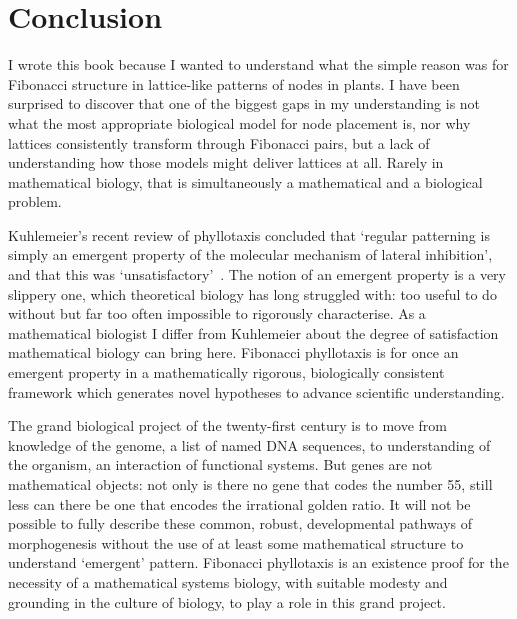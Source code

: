 \section{Conclusion}
I wrote this book because I wanted to understand what the simple reason was for Fibonacci structure in lattice-like patterns of nodes in plants. I have been surprised to discover that one of the biggest gaps in my understanding is not  what the most appropriate biological model for node placement is, nor why lattices consistently transform through Fibonacci pairs,  but a lack of understanding how those models might deliver lattices at all. Rarely in mathematical biology, that is simultaneously a mathematical and a biological problem. 

Kuhlemeier's recent review of phyllotaxis concluded  that `regular patterning is simply an emergent property of the molecular mechanism of lateral inhibition', and that this was  `unsatisfactory'~\autocite{kuhlemeierPhyllotaxis2017}. 
The notion of an emergent property is a very slippery one, which theoretical biology has long struggled with: too useful to do without but far too often impossible to rigorously characterise. As a mathematical biologist I differ from Kuhlemeier about the degree of satisfaction mathematical biology can bring here. Fibonacci phyllotaxis is for once an emergent property in a mathematically rigorous, biologically consistent framework which generates novel hypotheses to advance scientific understanding. 

The grand biological project of the twenty-first century is to move from knowledge of the genome, a list of named DNA sequences, to understanding of the organism, an interaction of functional systems.  But genes are not mathematical objects: not only is there no gene that codes the number 55, still less can there be one that encodes the irrational golden ratio.
It will not be possible to fully describe these common, robust, developmental pathways of morphogenesis without the use of at least some mathematical structure to  understand `emergent' pattern. %
Fibonacci phyllotaxis is an existence proof for the necessity of a mathematical systems biology, with suitable modesty and grounding in the culture of biology, to play a role in this grand project. 

